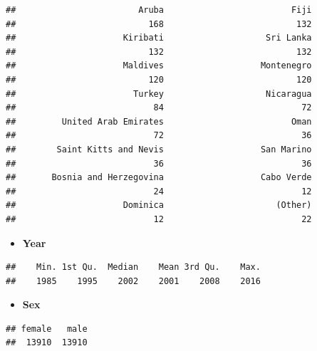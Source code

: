 \documentclass[]{article}
\newenvironment{Shaded}{\begin{snugshade}}{\end{snugshade}}
\newcommand{\CommentTok}[1]{\textcolor[rgb]{0.56,0.35,0.01}{\textit{#1}}}
\newcommand{\KeywordTok}[1]{\textcolor[rgb]{0.13,0.29,0.53}{\textbf{#1}}}
\newcommand{\NormalTok}[1]{#1}
\newcommand{\OperatorTok}[1]{\textcolor[rgb]{0.81,0.36,0.00}{\textbf{#1}}}
\providecommand{\tightlist}{%
  \setlength{\itemsep}{0pt}\setlength{\parskip}{0pt}}
\begin{document}
\begin{verbatim}
##                        Aruba                         Fiji 
##                          168                          132 
##                     Kiribati                    Sri Lanka 
##                          132                          132 
##                     Maldives                   Montenegro 
##                          120                          120 
##                       Turkey                    Nicaragua 
##                           84                           72 
##         United Arab Emirates                         Oman 
##                           72                           36 
##        Saint Kitts and Nevis                   San Marino 
##                           36                           36 
##       Bosnia and Herzegovina                   Cabo Verde 
##                           24                           12 
##                     Dominica                      (Other) 
##                           12                           22
\end{verbatim}

\begin{itemize}
\tightlist
\item
  \textbf{Year}
\end{itemize}

\begin{Shaded}
\end{Shaded}

\begin{verbatim}
##    Min. 1st Qu.  Median    Mean 3rd Qu.    Max. 
##    1985    1995    2002    2001    2008    2016
\end{verbatim}

\begin{itemize}
\tightlist
\item
  \textbf{Sex}
\end{itemize}

\begin{Shaded}
\end{Shaded}

\begin{verbatim}
## female   male 
##  13910  13910
\end{verbatim}
\end{document}
